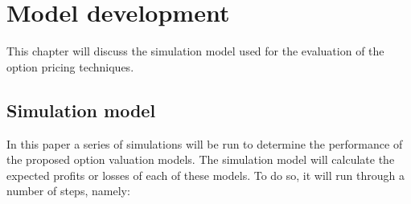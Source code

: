\chapter{Model development}
\label{chap:ModelDevelopment}
This chapter will discuss the simulation model used for the evaluation of the option pricing techniques.  

\section{Simulation model}
In this paper a series of simulations will be run to determine the performance of the proposed option valuation models. The simulation model will calculate the expected profits or losses of each of these models. To do so, it will run through a number of steps, namely:

